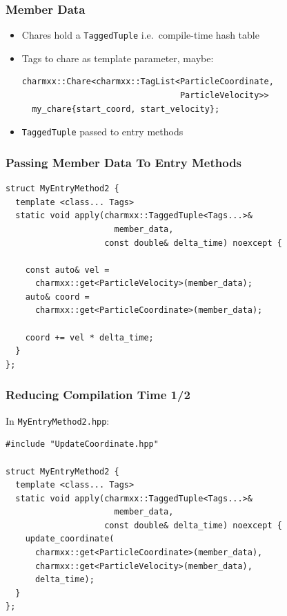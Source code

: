 \documentclass[svgnames,tikz,serif,ragged2e]{beamer}
\begin{document}
\begin{frame}[fragile]
  \frametitle{Member Data}
  \begin{itemize}
  \item Chares hold a \texttt{TaggedTuple} i.e.~compile-time hash table
  \item Tags to chare as template parameter, maybe:
\begin{lstlisting}
charmxx::Chare<charmxx::TagList<ParticleCoordinate,
                                ParticleVelocity>>
  my_chare{start_coord, start_velocity};
\end{lstlisting}
  \item \texttt{TaggedTuple} passed to entry methods
  \end{itemize}
\end{frame}

\begin{frame}[fragile]
  \frametitle{Passing Member Data To Entry Methods}
\begin{lstlisting}
struct MyEntryMethod2 {
  template <class... Tags>
  static void apply(charmxx::TaggedTuple<Tags...>&
                      member_data,
                    const double& delta_time) noexcept {

    const auto& vel =
      charmxx::get<ParticleVelocity>(member_data);
    auto& coord =
      charmxx::get<ParticleCoordinate>(member_data);

    coord += vel * delta_time;
  }
};
\end{lstlisting}
\end{frame}

\begin{frame}[fragile]
  \frametitle{Reducing Compilation Time 1/2}
  In \texttt{MyEntryMethod2.hpp}:
\begin{lstlisting}
#include "UpdateCoordinate.hpp"

struct MyEntryMethod2 {
  template <class... Tags>
  static void apply(charmxx::TaggedTuple<Tags...>&
                      member_data,
                    const double& delta_time) noexcept {
    update_coordinate(
      charmxx::get<ParticleCoordinate>(member_data),
      charmxx::get<ParticleVelocity>(member_data),
      delta_time);
  }
};
\end{lstlisting}
\end{frame}
\end{document}
